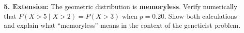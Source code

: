 \documentclass[10pt]{article}
\begin{document}
\begin{practicebox}
\vspace{8pt}
\textbf{5. Extension:} The geometric distribution is \textbf{memoryless}.
Verify numerically that $P(X > 5 \mid X > 2) = P(X > 3)$ when $p = 0.20$.
Show both calculations and explain what ``memoryless'' means in the context
of the geneticist problem.

\vspace{4pt}
\writeline\\[1pt]\writeline\\[1pt]\writeline

\end{practicebox}
\end{document}

